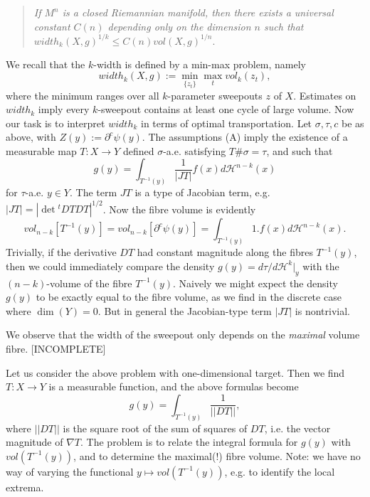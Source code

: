 \documentclass[12pt]{amsart}
\theoremstyle{definition}
\theoremstyle{remark}
\newcommand{\del}{\partial}
\newcommand{\sub}{\del^c \psi(y)}
\begin{document}
\begin{quote} 
\emph{ If $M^n$ is a closed Riemannian manifold, then there exists a universal constant $C(n)$ depending only on the dimension $n$ such that $width_k(X,g)^{1/k}\leq C(n) vol(X,g)^{1/n}.$
} 
\end{quote} 



We recall that the $k$-width is defined by a min-max problem, namely $$width_k(X,g):=\min_{\{z_t\}} \max_{t} vol_k(z_t),$$ where the minimum ranges over all $k$-parameter sweepouts $z$ of $X$. Estimates on $width_k$ imply every $k$-sweepout contains at least one cycle of large volume. Now our task is to interpret $width_k$ in terms of optimal transportation.  Let $\sigma, \tau, c$ be as above, with $Z(y):=\sub$. The assumptions (A) imply the existence of a measurable map $T: X\to Y$ defined $\sigma$-a.e. satisfying $T\# \sigma = \tau$, and such that $$g(y)=\int_{T^{-1}(y)} \frac{1}{|JT|} f(x) d\mathscr{H}^{n-k}(x) $$ for $\tau$-a.e. $y\in Y$. The term $JT$ is a type of Jacobian term, e.g. $|JT|=|\det {}^t DT DT|^{1/2}$. Now the fibre volume is evidently $$vol_{n-k}[T^{-1}(y)]=vol_{n-k} [\sub]=\int_{T^{-1}(y)} 1 . f(x) d\mathscr{H}^{n-k}(x).$$ Trivially, if the derivative $DT$ had constant magnitude along the fibres $T^{-1}(y)$, then we could immediately compare the density $g(y)=d\tau/d\mathscr{H}^{k}|_y$ with the $(n-k)$-volume of the fibre $T^{-1}(y)$. Naively we might expect the density $g(y)$ to be exactly equal to the fibre volume, as we find in the discrete case where $\dim(Y)=0$. But in general the Jacobian-type term $|JT|$ is nontrivial. 

We observe that the width of the sweepout only depends on the \emph{maximal} volume fibre. [INCOMPLETE]



Let us consider the above problem with one-dimensional target. Then we find $T: X \to Y$ is a measurable function, and the above formulas become 
$$g(y)=\int_{T^{-1}(y)} \frac{1}{||DT||}, $$ where $||DT||$ is the square root of the sum of squares of $DT$, i.e. the vector magnitude of $\nabla T$. The problem is to relate the integral formula for $g(y)$ with $vol(T^{-1}(y))$, and to determine the maximal(!) fibre volume. Note: we have no way of varying the functional $y\mapsto vol(T^{-1}(y))$, e.g. to identify the local extrema.
\end{document}
